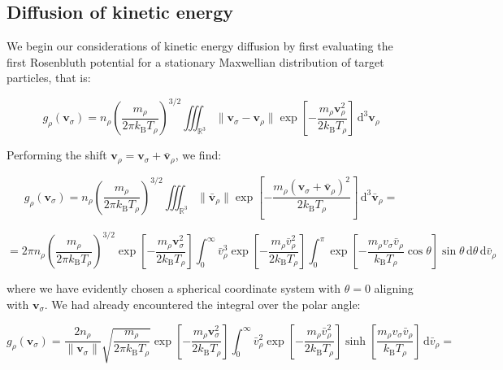 \subsection{Diffusion of kinetic energy}

We begin our considerations of kinetic energy diffusion by first evaluating the first Rosenbluth potential for a stationary Maxwellian distribution of target particles, that is:

\begin{equation}
    g_\rho(\mathbf{v}_\sigma)=n_\rho\left(\frac{m_\rho}{2\pi k_\mathrm{B}T_\rho}\right)^{3/2}\iiint_{\mathbb{R}^3}\|\mathbf{v}_\sigma-\mathbf{v}_\rho\|\exp{\left[-\frac{m_\rho\mathbf{v}_\rho^2}{2k_\mathrm{B}T_\rho}\right]}\,\mathrm{d}^3\mathbf{v}_\rho
\end{equation}

Performing the shift $\mathbf{v}_\rho=\mathbf{v}_\sigma+\bar{\mathbf{v}}_\rho$, we find:

\begin{equation}
    g_\rho(\mathbf{v}_\sigma)=n_\rho\left(\frac{m_\rho}{2\pi k_\mathrm{B}T_\rho}\right)^{3/2}\iiint_{\mathbb{R}^3}\|\bar{\mathbf{v}}_\rho\|\exp{\left[-\frac{m_\rho(\mathbf{v}_\sigma+\bar{\mathbf{v}}_\rho)^2}{2k_\mathrm{B}T_\rho}\right]}\,\mathrm{d}^3\bar{\mathbf{v}}_\rho=
\end{equation}

\begin{equation}
    =2\pi n_\rho\left(\frac{m_\rho}{2\pi k_\mathrm{B}T_\rho}\right)^{3/2}\exp{\left[-\frac{m_\rho\mathbf{v}_\sigma^2}{2k_\mathrm{B}T_\rho}\right]}\int_0^\infty\bar{v}_\rho^3\exp{\left[-\frac{m_\rho\bar{v}_\rho^2}{2k_\mathrm{B}T_\rho}\right]}\int_0^\pi\exp{\left[-\frac{m_\rho v_\sigma\bar{v}_\rho}{k_\mathrm{B}T_\rho}\cos{\theta}\right]}\sin{\theta}\,\mathrm{d}\theta\,\mathrm{d}\bar{v}_\rho
\end{equation}

where we have evidently chosen a spherical coordinate system with $\theta=0$ aligning with $\mathbf{v}_\sigma$. We had already encountered the integral over the polar angle:

\begin{equation}
    g_\rho(\mathbf{v}_\sigma)=\frac{2n_\rho}{\|\mathbf{v}_\sigma\|}\sqrt{\frac{m_\rho}{2\pi k_\mathrm{B}T_\rho}}\exp{\left[-\frac{m_\rho\mathbf{v}_\sigma^2}{2k_\mathrm{B}T_\rho}\right]}\int_0^\infty\bar{v}_\rho^2\exp{\left[-\frac{m_\rho\bar{v}_\rho^2}{2k_\mathrm{B}T_\rho}\right]}\sinh{\left[\frac{m_\rho v_\sigma\bar{v}_\rho}{k_\mathrm{B}T_\rho}\right]}\,\mathrm{d}\bar{v}_\rho=
\end{equation}

